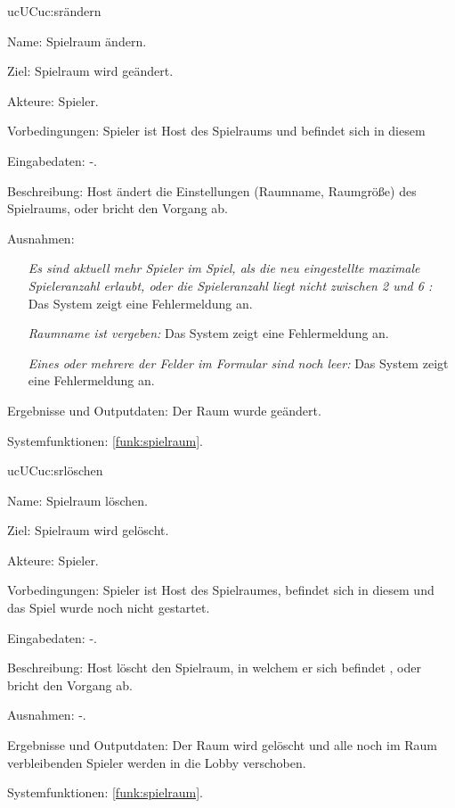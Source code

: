 \begin{description}[leftmargin=5em, style=sameline]
	 
	\begin{lhp}{uc}{UC}{uc:srändern} %
		\item [Name:] Spielraum ändern.
		\item [Ziel:] Spielraum wird geändert.
		\item [Akteure:] Spieler.
		\item [Vorbedingungen:] Spieler ist Host des Spielraums und befindet sich in diesem
		\item [Eingabedaten:] -.
		\item [Beschreibung:] Host ändert die Einstellungen (Raumname, Raumgröße) des Spielraums, oder bricht den Vorgang ab.
		\item [Ausnahmen:] \hfill
		\begin{itemize} 
				\item[] \textit{Es sind aktuell mehr Spieler im Spiel, als die neu eingestellte maximale Spieleranzahl erlaubt, oder die Spieleranzahl liegt nicht zwischen 2 und 6 :} Das System zeigt eine Fehlermeldung an.
				\item[] \textit{Raumname ist vergeben:} Das System zeigt eine Fehlermeldung an.
				\item[] \textit{Eines oder mehrere der Felder im Formular sind noch leer:} Das System zeigt eine Fehlermeldung an.
	  \end{itemize}
		\item [Ergebnisse und Outputdaten:] Der Raum wurde geändert.	
		\item [Systemfunktionen:] \ref{funk:spielraum}. 
	\end{lhp}
	
	\begin{lhp}{uc}{UC}{uc:srlöschen} 
		\item [Name:] Spielraum löschen.
		\item [Ziel:] Spielraum wird gelöscht.
		\item [Akteure:] Spieler. 
		\item [Vorbedingungen:] Spieler ist Host des Spielraumes, befindet sich in diesem und das Spiel wurde noch nicht gestartet. 
		\item [Eingabedaten:]  -.
		\item [Beschreibung:] Host löscht den Spielraum, in welchem er sich befindet , oder bricht den Vorgang ab.
		\item [Ausnahmen:] -. 
		\item [Ergebnisse und Outputdaten:] Der Raum wird gelöscht und alle noch im Raum verbleibenden Spieler werden in die Lobby verschoben.	
		\item [Systemfunktionen:] \ref{funk:spielraum}. 
	\end{lhp}
	

\end{description}
